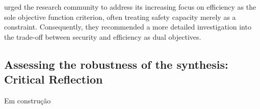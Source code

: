  urged the research community to address its increasing focus on efficiency as the sole objective function criterion, often treating safety capacity merely as a constraint. Consequently, they recommended a more detailed investigation into the trade-off between security and efficiency as dual objectives.


\subsection{Assessing the robustness of the synthesis: Critical Reflection}


Em construção